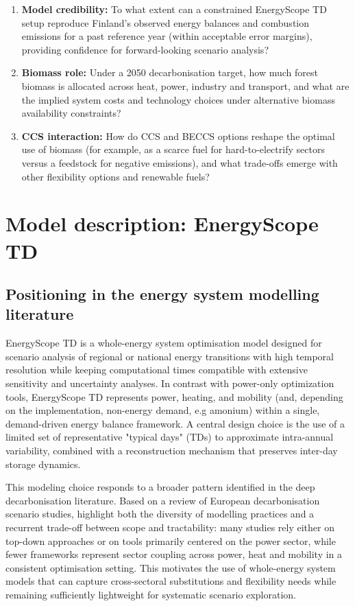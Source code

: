 \documentclass{article}
\begin{document}
\begin{enumerate}
  \item \textbf{Model credibility:} To what extent can a constrained EnergyScope TD setup reproduce Finland's observed energy balances and combustion emissions for a past reference year (within acceptable error margins), providing confidence for forward-looking scenario analysis?
  \item \textbf{Biomass role:} Under a 2050 decarbonisation target, how much forest biomass is allocated across heat, power, industry and transport, and what are the implied system costs and technology choices under alternative biomass availability constraints?
  \item \textbf{CCS interaction:} How do CCS and BECCS options reshape the optimal use of biomass (for example, as a scarce fuel for hard-to-electrify sectors versus a feedstock for negative emissions), and what trade-offs emerge with other flexibility options and renewable fuels?
\end{enumerate}


\section{Model description: EnergyScope TD}

\subsection{Positioning in the energy system modelling literature}
EnergyScope TD is a whole-energy system optimisation model designed for scenario analysis of regional or national energy transitions with high temporal resolution while keeping computational times compatible with extensive sensitivity and uncertainty analyses. In contrast with power-only optimization tools, EnergyScope TD represents power, heating, and mobility (and, depending on the implementation, non-energy demand, e.g amonium) within a single, demand-driven energy balance framework. A central design choice is the use of a limited set of representative "typical days" (TDs) to approximate intra-annual variability, combined with a reconstruction mechanism that preserves inter-day storage dynamics.

This modeling choice responds to a broader pattern identified in the deep decarbonisation literature. Based on a review of European decarbonisation scenario studies, \citet{borasio_deep_2022} highlight both the diversity of modelling practices and a recurrent trade-off between scope and tractability: many studies rely either on top-down approaches or on tools primarily centered on the power sector, while fewer frameworks represent sector coupling across power, heat and mobility in a consistent optimisation setting. This motivates the use of whole-energy system models that can capture cross-sectoral substitutions and flexibility needs while remaining sufficiently lightweight for systematic scenario exploration.
\end{document}
